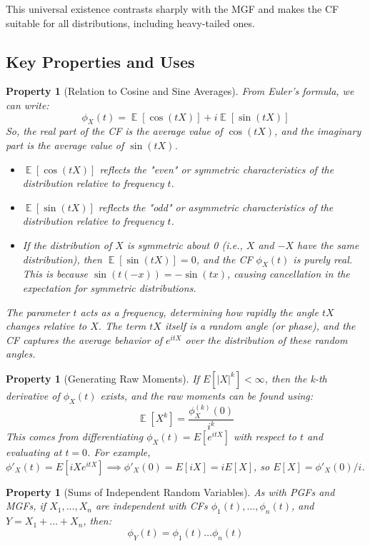 \documentclass[11pt, letterpaper]{article}
\newtheorem{property}[theorem]{Property}
\DeclareMathOperator{\E}{\mathbb{E}}
\begin{document}
This universal existence contrasts sharply with the MGF and makes the CF suitable for all distributions, including heavy-tailed ones.

\subsection{Key Properties and Uses}

\begin{property}[Relation to Cosine and Sine Averages]
From Euler's formula, we can write:
\begin{equation}
    \phi_X(t) = \E[\cos(tX)] + i \E[\sin(tX)]
\end{equation}
So, the real part of the CF is the average value of $\cos(tX)$, and the imaginary part is the average value of $\sin(tX)$.
\begin{itemize}
    \item $\E[\cos(tX)]$ reflects the "even" or symmetric characteristics of the distribution relative to frequency $t$.
    \item $\E[\sin(tX)]$ reflects the "odd" or asymmetric characteristics of the distribution relative to frequency $t$.
    \item If the distribution of $X$ is symmetric about 0 (i.e., $X$ and $-X$ have the same distribution), then $\E[\sin(tX)] = 0$, and the CF $\phi_X(t)$ is purely real. This is because $\sin(t(-x)) = -\sin(tx)$, causing cancellation in the expectation for symmetric distributions.
\end{itemize}
The parameter $t$ acts as a frequency, determining how rapidly the angle $tX$ changes relative to $X$. The term $tX$ itself is a random angle (or phase), and the CF captures the average behavior of $e^{itX}$ over the distribution of these random angles.
\end{property}

\begin{property}[Generating Raw Moments]
If $E[|X|^k] < \infty$, then the k-th derivative of $\phi_X(t)$ exists, and the raw moments can be found using:
\begin{equation}
    \E[X^k] = \frac{\phi_X^{(k)}(0)}{i^k}
\end{equation}
This comes from differentiating $\phi_X(t) = E[e^{itX}]$ with respect to $t$ and evaluating at $t=0$. For example, $\phi'_X(t) = E[iX e^{itX}] \implies \phi'_X(0) = E[iX] = iE[X]$, so $E[X] = \phi'_X(0)/i$.
\end{property}

\begin{property}[Sums of Independent Random Variables]
As with PGFs and MGFs, if $X_1, \dots, X_n$ are independent with CFs $\phi_1(t), \dots, \phi_n(t)$, and $Y = X_1 + \dots + X_n$, then:
\begin{equation}
    \phi_Y(t) = \phi_1(t) \dots \phi_n(t)
\end{equation}
\end{property}
\end{document}
